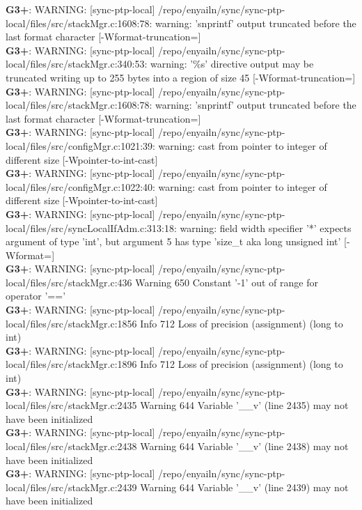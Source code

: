 \documentclass[12pt,twoside]{article}
\begin{document}
\textbf{G3+}: WARNING: [sync-ptp-local] /repo/enyailn/sync/sync-ptp-local/files/src/stackMgr.c:1608:78: warning: 'snprintf' output truncated before the last format character [-Wformat-truncation=]\\ 
\textbf{G3+}: WARNING: [sync-ptp-local] /repo/enyailn/sync/sync-ptp-local/files/src/stackMgr.c:340:53: warning: '\%s' directive output may be truncated writing up to 255 bytes into a region of size 45 [-Wformat-truncation=]\\ 
\textbf{G3+}: WARNING: [sync-ptp-local] /repo/enyailn/sync/sync-ptp-local/files/src/stackMgr.c:1608:78: warning: 'snprintf' output truncated before the last format character [-Wformat-truncation=]\\ 
\textbf{G3+}: WARNING: [sync-ptp-local] /repo/enyailn/sync/sync-ptp-local/files/src/configMgr.c:1021:39: warning: cast from pointer to integer of different size [-Wpointer-to-int-cast]\\ 
\textbf{G3+}: WARNING: [sync-ptp-local] /repo/enyailn/sync/sync-ptp-local/files/src/configMgr.c:1022:40: warning: cast from pointer to integer of different size [-Wpointer-to-int-cast]\\ 
\textbf{G3+}: WARNING: [sync-ptp-local] /repo/enyailn/sync/sync-ptp-local/files/src/syncLocalIfAdm.c:313:18: warning: field width specifier '*' expects argument of type 'int', but argument 5 has type 'size\_t {aka long unsigned int}' [-Wformat=]\\ 
\textbf{G3+}: WARNING: [sync-ptp-local] /repo/enyailn/sync/sync-ptp-local/files/src/stackMgr.c:436 Warning 650 Constant '-1' out of range for operator '=='\\ 
\textbf{G3+}: WARNING: [sync-ptp-local] /repo/enyailn/sync/sync-ptp-local/files/src/stackMgr.c:1856 Info 712 Loss of precision (assignment) (long to int)\\ 
\textbf{G3+}: WARNING: [sync-ptp-local] /repo/enyailn/sync/sync-ptp-local/files/src/stackMgr.c:1896 Info 712 Loss of precision (assignment) (long to int)\\ 
\textbf{G3+}: WARNING: [sync-ptp-local] /repo/enyailn/sync/sync-ptp-local/files/src/stackMgr.c:2435 Warning 644 Variable '\_\_v' (line 2435) may not have been initialized\\ 
\textbf{G3+}: WARNING: [sync-ptp-local] /repo/enyailn/sync/sync-ptp-local/files/src/stackMgr.c:2438 Warning 644 Variable '\_\_v' (line 2438) may not have been initialized\\ 
\textbf{G3+}: WARNING: [sync-ptp-local] /repo/enyailn/sync/sync-ptp-local/files/src/stackMgr.c:2439 Warning 644 Variable '\_\_v' (line 2439) may not have been initialized\\ 
\end{document}
